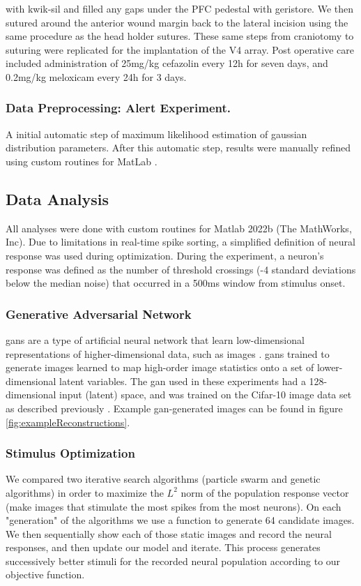 with kwik-sil and filled any gaps under the PFC pedestal with geristore. We then sutured around the anterior wound margin back to the lateral incision using the same procedure as the head holder sutures. These same steps from craniotomy to suturing were replicated for the implantation of the V4 array. Post operative care included administration of 25mg/kg cefazolin every 12h for seven days, and 0.2mg/kg meloxicam every 24h for 3 days.

\subsubsection*{Data Preprocessing: Alert Experiment.}
A initial automatic step of maximum likelihood estimation of gaussian distribution parameters. After this automatic step, results were manually refined using custom routines for MatLab \parencite{Kelly2007}.


\subsection*{Data Analysis}
All analyses were done with custom routines for Matlab 2022b (The MathWorks, Inc). Due to limitations in real-time spike sorting, a simplified definition of neural response was used during optimization. During the experiment, a neuron's response was defined as the number of threshold crossings (-4 standard deviations below the median noise) that occurred in a 500ms window from stimulus onset. 


\subsubsection*{Generative Adversarial Network}
\label{methods:gan}
\Glspl{gan} are a type of artificial neural network that learn low-dimensional representations of higher-dimensional data, such as images \parencite{Karras2019}. \glspl{gan} trained to generate images learned to map high-order image statistics onto a set of lower-dimensional latent variables. The \gls{gan} used in these experiments had a 128-dimensional input (latent) space, and was trained on the Cifar-10 image data set as described previously \cite{Fruend2018}. Example \gls{gan}-generated images can be found in figure \ref{fig:exampleReconstructions}.

\subsubsection*{Stimulus Optimization}
We compared two iterative search algorithms (particle swarm and genetic algorithms) in order to maximize the $L^2$ norm of the population response vector (make images that stimulate the most spikes from the most neurons). On each "generation" of the algorithms we use a function to generate 64 candidate images. We then sequentially show each of those static images and record the neural responses, and then update our model and iterate. This process generates successively better stimuli for the recorded neural population according to our objective function. 

